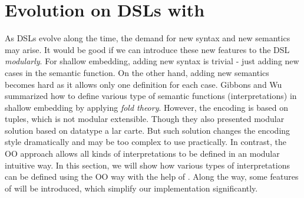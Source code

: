 \section{Evolution on DSLs with \name}

\begin{comment}
Weixin writes this one.

Go over jeremy's examples, maybe having only 3 diagram 
constructs instead of 5 for space reasons.

Use five constructs to show extensibility.

Think of how to introduce our tool? Using the Jeremy's examples? 
or introducing before with some other examples?

\end{comment}

As DSLs evolve along the time, the demand for new syntax and new semantics may arise.
It would be good if we can introduce these new features to the DSL \emph{modularly}.
For shallow embedding, adding new syntax is trivial - just adding new cases in
the semantic function. On the other hand, adding new semantics becomes hard as it allows
only one definition for each case. Gibbons and Wu summarized how to define
various type of semantic functions (interpretations) in shallow embedding by
applying \emph{fold theory}. However, the encoding is based on tuples, which is
not modular extensible. Though they also presented modular solution based on
datatype a lar carte\cite{}. But such solution changes the encoding style
dramatically and may be too complex to use practically.
In contrast, the OO approach allows all kinds of
interpretations to be defined in an modular intuitive way.
In this section, we will show how various types of interpretations can be
defined using the OO way with the help of \name. Along the way,
some features of \name will be introduced, which simplify our implementation significantly.


